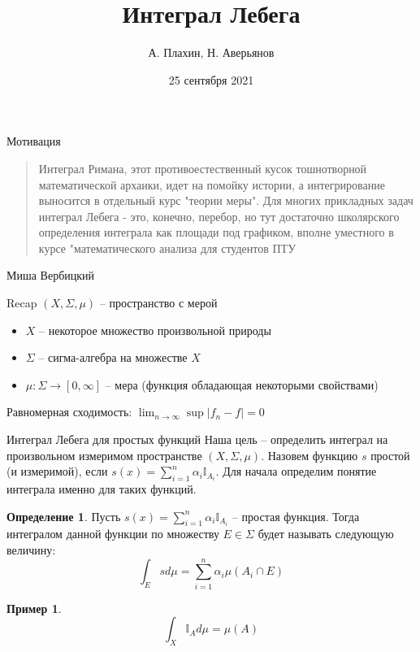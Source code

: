 \documentclass{beamer}%
\title{Интеграл Лебега}
\author[А. Плахин, Н. Аверьянов]{А. Плахин, Н. Аверьянов}
\institute[Клуб теории вероятностей]{Клуб теории вероятностей ФЭН ВШЭ}
\date{25 сентября 2021}
\theoremstyle{definition}
\newtheorem{mydef}[theorem]{Определение}
\newtheorem{myexample}[theorem]{Пример}
\DeclareMathOperator{\sup}{sup}
\begin{document}
\begin{frame}
\titlepage
\end{frame}

\begin{frame}{Мотивация}
\begin{quote} Интеграл Римана, этот противоестественный кусок тошнотворной 
математической архаики, идет на помойку истории, 
а интегрирование выносится в отдельный курс
"теории меры". Для многих прикладных задач интеграл
Лебега - это, конечно, перебор, но тут достаточно
школярского определения интеграла как площади под 
графиком, вполне уместного в курсе "математического 
анализа для студентов ПТУ
\end{quote}
\flushright Миша Вербицкий
\end{frame}

\begin{frame}{Recap}
    $(X, \Sigma, \mu)$ -- пространство с мерой

\begin{itemize}
    \item $X$ -- некоторое множество произвольной природы
    \item $\Sigma$ -- сигма-алгебра на множестве $X$
    \item $\mu: \Sigma \to [0, \infty]$ -- мера (функция обладающая некоторыми свойствами)
\end{itemize}

Равномерная сходимость: $\lim_{n \to \infty} \sup|f_n - f| = 0$
\end{frame}

\begin{frame}{Интеграл Лебега для простых функций}
Наша цель -- определить интеграл на произвольном измеримом пространстве $(X, \Sigma, \mu)$. Назовем функцию $s$ простой (и измеримой), если  
$s(x) = \sum_{i=1}^n \alpha_i \mathbb{I}_{A_i}$. Для начала определим понятие интеграла именно для таких функций.

\begin{mydef}
Пусть $s(x) = \sum_{i=1}^n \alpha_i \mathbb{I}_{A_i}$ -- простая функция. Тогда интегралом данной функции по множеству $E \in \Sigma$ будет называть следующую величину:
$$
\int_E sd\mu = \sum_{i=1}^n \alpha_i \mu(A_i \cap E) 
$$
\end{mydef}

\begin{myexample}
$$\int_X \mathbb{I}_{A} d\mu = \mu(A)$$
\end{myexample}

\end{frame}
\end{document}
